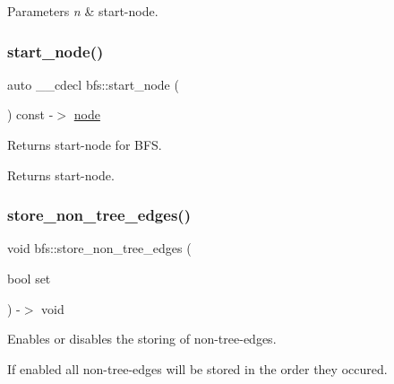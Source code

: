 \begin{DoxyParams}{Parameters}
{\em n} & start-\/node. \\
\hline
\end{DoxyParams}
\mbox{\label{classbfs_a80a7ae50880684eb261e7e8e807645ef}} 
\subsubsection{\texorpdfstring{start\+\_\+node()}{start\_node()}\hspace{0.1cm}{\footnotesize\ttfamily [2/2]}}
{\footnotesize\ttfamily auto \+\_\+\+\_\+cdecl bfs\+::start\+\_\+node (\begin{DoxyParamCaption}{ }\end{DoxyParamCaption}) const -\/$>$ \mbox{\hyperlink{classnode}{node}} \hspace{0.3cm}{\ttfamily [inline]}}



Returns start-\/node for B\+FS. 

\begin{DoxyReturn}{Returns}
start-\/node. 
\end{DoxyReturn}
\mbox{\label{classbfs_afed1aa751dbea4b6fb9dbdcea24b04f2}} 
\subsubsection{\texorpdfstring{store\+\_\+non\+\_\+tree\+\_\+edges()}{store\_non\_tree\_edges()}\hspace{0.1cm}{\footnotesize\ttfamily [1/2]}}
{\footnotesize\ttfamily void bfs\+::store\+\_\+non\+\_\+tree\+\_\+edges (\begin{DoxyParamCaption}\item[{bool}]{set }\end{DoxyParamCaption}) -\/$>$ void}



Enables or disables the storing of non-\/tree-\/edges. 

If enabled all non-\/tree-\/edges will be stored in the order they occured.


